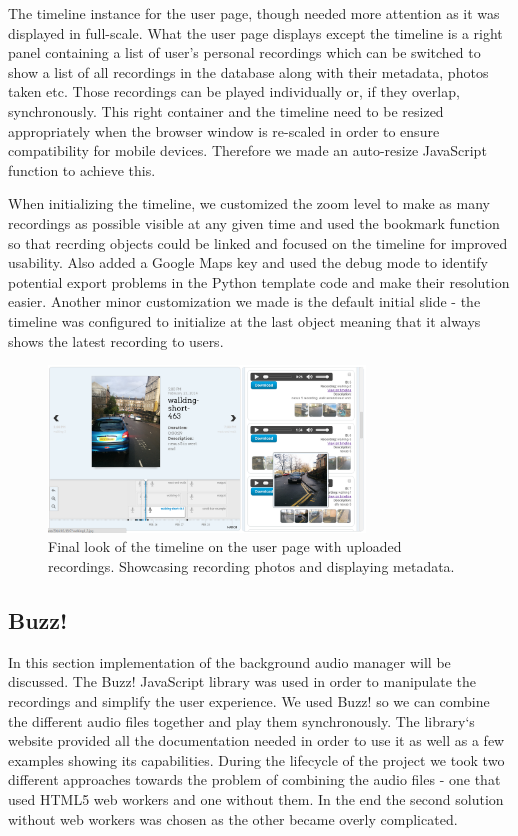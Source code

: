 \documentclass{l3proj}
\begin{document}
The timeline instance for the user page, though needed more attention as it was displayed in full-scale. What the user page displays except the timeline is a right panel containing a list of user's personal recordings which can be switched to show a list of all recordings in the database along with their metadata, photos taken etc.
Those recordings can be played individually or, if they overlap, synchronously. This right container and the timeline need to be resized appropriately when the browser window is re-scaled in order to ensure compatibility for mobile devices.
Therefore we made an auto-resize JavaScript function to achieve this.

When initializing the timeline, we customized the zoom level to make as many recordings as possible visible at any given time and used the bookmark function so that recrding objects could be linked and focused on the timeline for improved usability.
Also added a Google Maps key and used the debug mode to identify potential export problems in the \gls{Python} template code and make their resolution easier. Another minor customization we made is the default initial slide - the timeline was configured to initialize at the last object meaning that it always shows the latest recording to users.


\begin{figure}[ht!]
  \centering
\includegraphics[width=0.75\textwidth]{images/timeline_final.png}
\caption{Final look of the timeline on the user page with uploaded recordings. Showcasing recording photos and displaying metadata.}
\end{figure}

\subsection{Buzz!}
In this section implementation of the background audio manager will be discussed. The Buzz! \gls{JavaScript} library was used in order to manipulate the recordings and simplify the user experience. We used Buzz! so we can combine the different audio files together and play them synchronously. The library`s website provided all the documentation needed in order to use it as well as a few examples showing its capabilities. During the lifecycle of the project we took two different approaches towards the problem of combining the audio files - one that used HTML5 web workers and one without them. In the end the second solution without web workers was chosen as the other became overly complicated.
\end{document}
